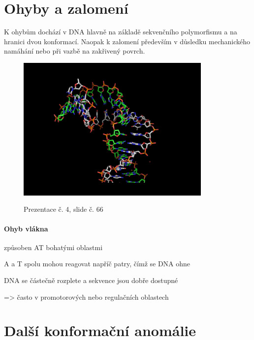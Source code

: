 \documentclass[DIV=8]{scrreprt}
\begin{document}
\section{Ohyby a zalomení} \label{Ohyby a zalomení} \FloatBarrier


K ohybům dochází v DNA hlavně na základě sekvenčního polymorfismu a na hranici dvou konformací. Naopak k zalomení především v důsledku mechanického namáhání nebo při vazbě na zakřivený povrch.

\begin{figure}
    \caption{Prezentace č. 4, slide č. 66}
    \includegraphics[width=0.85\textwidth]{slides-4/slide-66.jpg}
    \centering
    \label{slides-4-slide-66}
\end{figure}

\paragraph{Ohyb vlákna}
\begin{myItemize}[nosep]
    \item způsoben AT bohatými oblastmi
    \item A a T spolu mohou reagovat napříč patry, čímž se DNA ohne
    \item DNA se částečně rozplete a sekvence jsou dobře dostupné
\begin{myItemize}[nosep]
    \item => často v promotorových nebo regulačních oblastech
\end{myItemize}

\end{myItemize}



\section{Další konformační anomálie} \label{Další konformační anomálie} \FloatBarrier
\end{document}
